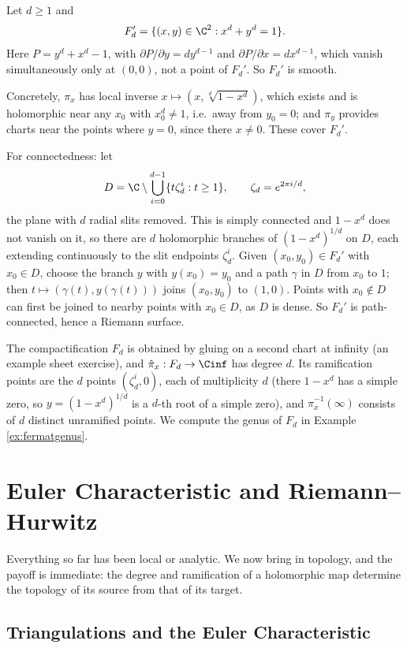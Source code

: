 \begin{example}\label{ex:fermat}
	Let $d \geq 1$ and
	$$
	F_d' = \{(x,y)\in\C^2 : x^d + y^d = 1\}.
	$$
	Here $P = y^d + x^d - 1$, with $\partial P/\partial y = dy^{d-1}$ and
	$\partial P /\partial x = dx^{d-1}$, which vanish simultaneously only at $(0,0)$, not a
	point of $F_d'$. So $F_d'$ is smooth.

	Concretely, $\pi_x$ has local inverse $x \mapsto (x, \sqrt[d]{1-x^d})$, which exists
	and is holomorphic near any $x_0$ with $x_0^d \neq 1$, i.e.\ away from
	$y_0 = 0$; and $\pi_y$ provides charts near the points where $y = 0$, since there
	$x \ne 0$. These cover $F_d'$.

	For connectedness: let
	$$
	D = \C\setminus\bigcup_{i=0}^{d-1}\{t\zeta_d^i : t \geq 1\}, \qquad \zeta_d = e^{2\pi i/d},
	$$
	the plane with $d$ radial slits removed. This is simply connected and $1 - x^d$ does not
	vanish on it, so there are $d$ holomorphic branches of $(1-x^d)^{1/d}$ on $D$, each
	extending continuously to the slit endpoints $\zeta_d^i$. Given $(x_0,y_0)\in F_d'$ with
	$x_0\in D$, choose the branch $y$ with $y(x_0)=y_0$ and a path $\gamma$ in $D$ from
	$x_0$ to $1$; then $t\mapsto (\gamma(t), y(\gamma(t)))$ joins $(x_0,y_0)$ to $(1,0)$.
	Points with $x_0 \notin D$ can first be joined to nearby points with $x_0 \in D$, as $D$
	is dense. So $F_d'$ is path-connected, hence a Riemann surface.

	The compactification $F_d$ is obtained by gluing on a second chart at infinity (an
	example sheet exercise), and $\hat\pi_x : F_d \to \Cinf$ has degree $d$. Its
	ramification points are the $d$ points $(\zeta_d^i, 0)$, each of multiplicity $d$ (there
	$1 - x^d$ has a simple zero, so $y = (1-x^d)^{1/d}$ is a $d$-th root of a simple zero),
	and $\hat\pi_x^{-1}(\infty)$ consists of $d$ distinct unramified points. We compute the
	genus of $F_d$ in Example \ref{ex:fermatgenus}.
\end{example}

\section{Euler Characteristic and Riemann--Hurwitz}\label{sec:RH}

Everything so far has been local or analytic. We now bring in topology, and the payoff is
immediate: the degree and ramification of a holomorphic map determine the topology of its
source from that of its target.

\subsection{Triangulations and the Euler Characteristic}

